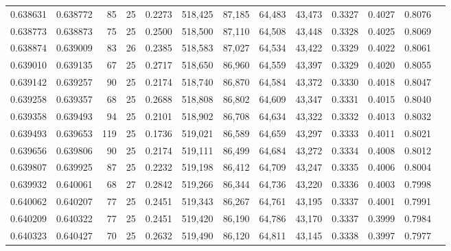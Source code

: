 \begin{tabular}{rrrrrrrrrrrrr}
0.638631 & 0.638772 &    85 &  25 &                                     0.2273 & 518,425 &  87,185 &  64,483 &  43,473 & 0.3327 & 0.4027 & 0.8076 \\
0.638773 & 0.638873 &    75 &  25 &                                     0.2500 & 518,500 &  87,110 &  64,508 &  43,448 & 0.3328 & 0.4025 & 0.8069 \\
0.638874 & 0.639009 &    83 &  26 &                                     0.2385 & 518,583 &  87,027 &  64,534 &  43,422 & 0.3329 & 0.4022 & 0.8061 \\
0.639010 & 0.639135 &    67 &  25 &                                     0.2717 & 518,650 &  86,960 &  64,559 &  43,397 & 0.3329 & 0.4020 & 0.8055 \\
0.639142 & 0.639257 &    90 &  25 &                                     0.2174 & 518,740 &  86,870 &  64,584 &  43,372 & 0.3330 & 0.4018 & 0.8047 \\
0.639258 & 0.639357 &    68 &  25 &                                     0.2688 & 518,808 &  86,802 &  64,609 &  43,347 & 0.3331 & 0.4015 & 0.8040 \\
0.639358 & 0.639493 &    94 &  25 &                                     0.2101 & 518,902 &  86,708 &  64,634 &  43,322 & 0.3332 & 0.4013 & 0.8032 \\
0.639493 & 0.639653 &   119 &  25 &                                     0.1736 & 519,021 &  86,589 &  64,659 &  43,297 & 0.3333 & 0.4011 & 0.8021 \\
0.639656 & 0.639806 &    90 &  25 &                                     0.2174 & 519,111 &  86,499 &  64,684 &  43,272 & 0.3334 & 0.4008 & 0.8012 \\
0.639807 & 0.639925 &    87 &  25 &                                     0.2232 & 519,198 &  86,412 &  64,709 &  43,247 & 0.3335 & 0.4006 & 0.8004 \\
0.639932 & 0.640061 &    68 &  27 &                                     0.2842 & 519,266 &  86,344 &  64,736 &  43,220 & 0.3336 & 0.4003 & 0.7998 \\
0.640062 & 0.640207 &    77 &  25 &                                     0.2451 & 519,343 &  86,267 &  64,761 &  43,195 & 0.3337 & 0.4001 & 0.7991 \\
0.640209 & 0.640322 &    77 &  25 &                                     0.2451 & 519,420 &  86,190 &  64,786 &  43,170 & 0.3337 & 0.3999 & 0.7984 \\
0.640323 & 0.640427 &    70 &  25 &                                     0.2632 & 519,490 &  86,120 &  64,811 &  43,145 & 0.3338 & 0.3997 & 0.7977 \\

\end{tabular}
